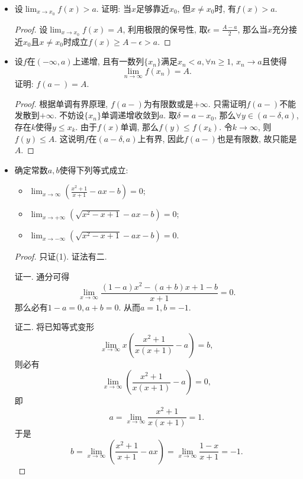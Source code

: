 \documentclass[UTF8,11pt, a4paper, oneside, fontset=none]{ctexbook}
\begin{document}
\begin{itemize}
\item[1.] 设$\lim_{x \to x_0}f(x) > a $. 证明: 当$x$足够靠近$x_0$, 但$x \neq x_0$时, 有$f(x) >a$.

\begin{proof}
设$\lim_{x \to x_0}f(x) = A$, 利用极限的保号性, 取$\epsilon = \frac{A - a}{2}$, 那么当$x$充分接近$x_0$且$x \neq x_0$时成立$f(x) \geq A- \epsilon > a$.

\end{proof}

\item[2.] 设$f$在$(-\infty, a)$上递增, 且有一数列$\{x_n\}$满足$x_n < a, \forall n \geq 1$, $x _n \to a$且使得
\[
\lim_{n \to \infty}f(x_n) =A.
\]
证明: $f(a-)=A$.

\begin{proof}
根据单调有界原理, $f(a-)$为有限数或是$+\infty$. 只需证明$f(a-)$不能发散到$+\infty$. 不妨设$\{x_n\}$单调递增收敛到$a$. 取$\delta = a-x_0$, 那么$\forall y \in (a-\delta, a)$, 存在$k$使得$y \leq x_k$. 由于$f(x)$单调, 那么$f(y) \leq f(x_k)$. 令$k \to \infty$, 则$f(y) \leq A$. 这说明$f$在$(a-\delta, a)$上有界, 因此$f(a-)$也是有限数, 故只能是$A$.

\end{proof}

\item[3.] 确定常数$a, b$使得下列等式成立:

\begin{itemize}
\item[(1)] $\lim_{x \to \infty} \left( \frac{x^2 +1}{x+1} - ax -b \right)=0$;
\item[(2)] $\lim_{x \to +\infty}(\sqrt{x^2-x+1} -ax -b)=0$;
\item[(3)] $\lim_{x \to -\infty}(\sqrt{x^2-x+1} -ax -b)=0$.
\end{itemize}


\begin{proof}
只证(1). 证法有二.

证一. 通分可得
\[
\lim_{x \to \infty} \frac{(1-a)x^2 - (a+b)x +1-b}{x+1}=0.
\] 
那么必有$1-a=0, a+b=0$. 从而$a=1, b=-1$.


证二. 将已知等式变形
\[
\lim_{x \to \infty}x \left( \frac{x^2+1}{x(x+1)} -a\right) =b,
\]
则必有
\[
\lim_{x \to \infty} \left( \frac{x^2+1}{x(x+1)} -a\right) =0,
\]
即
\[
a = \lim_{x \to \infty}  \frac{x^2+1}{x(x+1)} =1.
\]
于是
\[
b = \lim_{x \to \infty} \left( \frac{x^2+1}{x+1} -ax\right) = \lim_{x \to \infty} \frac{1-x}{x+1} = -1.
\]

\end{proof}


\end{itemize}
\end{document}
